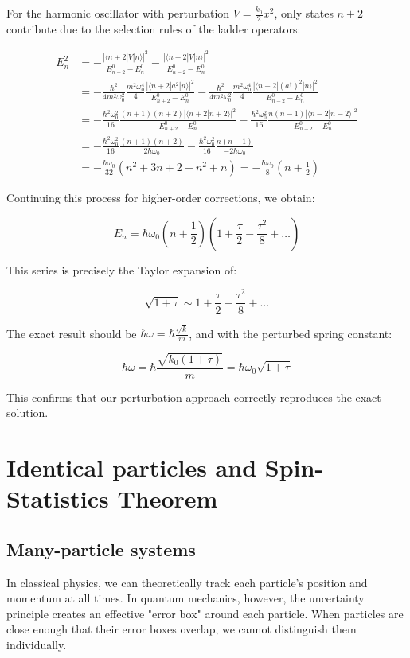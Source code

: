 \documentclass[italian]{HKNdocument}
\begin{document}
For the harmonic oscillator with perturbation $V=\frac{k_0}{2}x^2$, only states $n\pm 2$ contribute due to the selection rules of the ladder operators:

\begin{align}
E_n^2&=-\frac{|\langle n+2|V|n\rangle|^2}{E_{n+2}^0-E_n^0}-\frac{|\langle n-2|V|n\rangle|^2}{E_{n-2}^0-E_n^0}\\
&=-\frac{\hbar^2}{4m^2\omega_0^2}\frac{m^2\omega_0^4}{4}\frac{|\langle n+2|a^2|n\rangle|^2}{E_{n+2}^0-E_n^0}-\frac{\hbar^2}{4m^2\omega_0^2}\frac{m^2\omega_0^4}{4}\frac{|\langle n-2|(a^\dagger)^2|n\rangle|^2}{E_{n-2}^0-E_n^0}\\
&=-\frac{\hbar^2\omega_0^2}{16}\frac{(n+1)(n+2)|\langle n+2|n+2\rangle|^2}{E_{n+2}^0-E_n^0}-\frac{\hbar^2\omega_0^2}{16}\frac{n(n-1)|\langle n-2|n-2\rangle|^2}{E_{n-2}^0-E_n^0}\\
&=-\frac{\hbar^2\omega_0^2}{16}\frac{(n+1)(n+2)}{2\hbar\omega_0}-\frac{\hbar^2\omega_0^2}{16}\frac{n(n-1)}{-2\hbar\omega_0}\\
&=-\frac{\hbar\omega_0}{32}(n^2+3n+2-n^2+n)=-\frac{\hbar\omega_0}{8}(n+\frac{1}{2})
\end{align}

Continuing this process for higher-order corrections, we obtain:

\begin{equation}
E_n=\hbar\omega_0(n+\frac{1}{2})(1+\frac{\tau}{2}-\frac{\tau^2}{8}+\ldots)
\end{equation}

This series is precisely the Taylor expansion of:

\begin{equation}
\sqrt{1+\tau}\sim 1+\frac{\tau}{2}-\frac{\tau^2}{8}+\ldots
\end{equation}

The exact result should be $\hbar\omega=\hbar\frac{\sqrt{k}}{m}$, and with the perturbed spring constant:

\begin{equation}
\hbar\omega=\hbar\frac{\sqrt{k_0(1+\tau)}}{m}=\hbar\omega_0\sqrt{1+\tau}
\end{equation}

This confirms that our perturbation approach correctly reproduces the exact solution.

\section{Identical particles and Spin-Statistics Theorem}
\subsection{Many-particle systems}
In classical physics, we can theoretically track each particle's position and momentum at all times. In quantum mechanics, however, the uncertainty principle creates an effective "error box" around each particle. When particles are close enough that their error boxes overlap, we cannot distinguish them individually.
\end{document}
